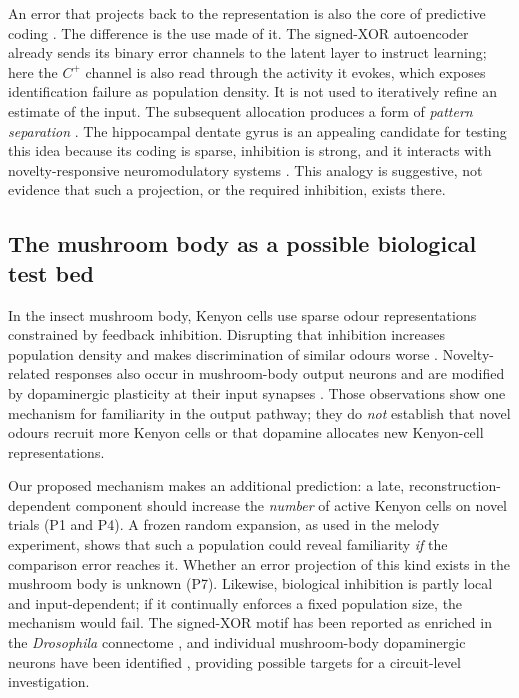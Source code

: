 \documentclass[11pt,a4paper]{article}
\begin{document}
An error that projects back to the representation is also the core of predictive coding \citep{rao1999}. The difference is the use made of it. The signed-XOR autoencoder already sends its binary error channels to the latent layer to instruct learning; here the $C^+$ channel is also read through the activity it evokes, which exposes identification failure as population density. It is not used to iteratively refine an estimate of the input. The subsequent allocation produces a form of \emph{pattern separation} \citep{yassa2011}. The hippocampal dentate gyrus is an appealing candidate for testing this idea because its coding is sparse, inhibition is strong, and it interacts with novelty-responsive neuromodulatory systems \citep{lisman2005}. This analogy is suggestive, not evidence that such a projection, or the required inhibition, exists there.

\subsection{The mushroom body as a possible biological test bed}
In the insect mushroom body, Kenyon cells use sparse odour representations constrained by feedback inhibition. Disrupting that inhibition increases population density and makes discrimination of similar odours worse \citep{lin2014}. Novelty-related responses also occur in mushroom-body output neurons and are modified by dopaminergic plasticity at their input synapses \citep{hattori2017}. Those observations show one mechanism for familiarity in the output pathway; they do \emph{not} establish that novel odours recruit more Kenyon cells or that dopamine allocates new Kenyon-cell representations.

Our proposed mechanism makes an additional prediction: a late, reconstruction-dependent component should increase the \emph{number} of active Kenyon cells on novel trials (P1 and P4). A frozen random expansion, as used in the melody experiment, shows that such a population could reveal familiarity \emph{if} the comparison error reaches it. Whether an error projection of this kind exists in the mushroom body is unknown (P7). Likewise, biological inhibition is partly local and input-dependent; if it continually enforces a fixed population size, the mechanism would fail. The signed-XOR motif has been reported as enriched in the \emph{Drosophila} connectome \citep{pena2026motif}, and individual mushroom-body dopaminergic neurons have been identified \citep{aso2016}, providing possible targets for a circuit-level investigation.
\end{document}
